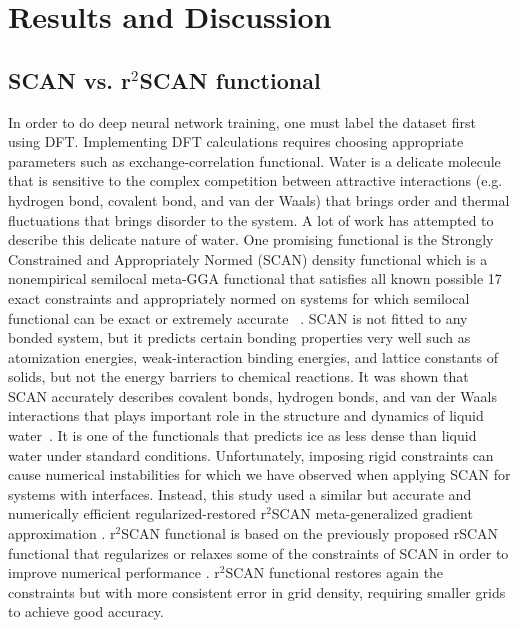 \chapter{Results and Discussion}

\section{SCAN vs. r$^2$SCAN functional}
In order to do deep neural network training, one must label the dataset first
using
DFT. Implementing DFT calculations requires choosing appropriate parameters
such as exchange-correlation functional. Water is a delicate molecule that is
sensitive to the  complex competition between attractive interactions (e.g.
hydrogen bond, covalent bond, and van der Waals) that brings order and thermal
fluctuations that brings disorder to the system. A lot of work has attempted to
describe this delicate nature of water. One promising functional is the
Strongly Constrained and Appropriately Normed (SCAN)  density
functional
which is  a nonempirical semilocal meta-GGA functional that satisfies
all
known possible 17 exact constraints and  appropriately normed on systems for
which semilocal functional can be exact or extremely accurate
~\cite{sun2015strongly}.  SCAN is not fitted to any bonded system, but it
predicts certain bonding properties very well such as  atomization
energies, weak-interaction binding energies, and lattice
constants of solids, but not the energy barriers to chemical
reactions. It was shown that SCAN accurately describes covalent bonds, hydrogen
bonds, and van der Waals interactions that plays important role in the
structure and dynamics of liquid water~\cite{chen2017ab}. It is one of the
functionals that predicts ice as less dense than liquid water under standard
conditions. Unfortunately,
imposing rigid constraints can cause numerical instabilities for which we have
observed when applying SCAN for systems with interfaces. Instead, this study
used a similar but accurate and numerically efficient regularized-restored
r$^2$SCAN
meta-generalized gradient
approximation \cite{Furness2020}. r$^2$SCAN functional is based on the
previously proposed rSCAN functional that regularizes or relaxes some of the
constraints of SCAN in order to improve
numerical performance \cite{bartok2019}. r$^2$SCAN functional restores again
the constraints but with more consistent error in grid density,
requiring smaller
grids to
achieve good accuracy.

